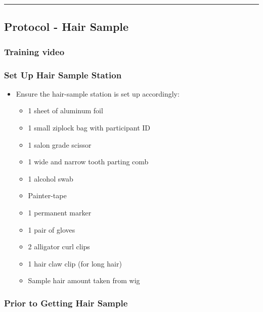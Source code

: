 \documentclass[]{book}
\providecommand{\tightlist}{%
  \setlength{\itemsep}{0pt}\setlength{\parskip}{0pt}}
\begin{document}
\begin{center}\rule{0.5\linewidth}{0.5pt}\end{center}

\hypertarget{protocol---hair-sample}{%
\subsection{Protocol - Hair Sample}\label{protocol---hair-sample}}

\hypertarget{training-video}{%
\subsubsection{Training video}\label{training-video}}

\hypertarget{set-up-hair-sample-station}{%
\subsubsection{Set Up Hair Sample Station}\label{set-up-hair-sample-station}}

\begin{itemize}
\tightlist
\item
  Ensure the hair-sample station is set up accordingly:

  \begin{itemize}
  \tightlist
  \item
    1 sheet of aluminum foil
  \item
    1 small ziplock bag with participant ID
  \item
    1 salon grade scissor
  \item
    1 wide and narrow tooth parting comb
  \item
    1 alcohol swab
  \item
    Painter-tape
  \item
    1 permanent marker
  \item
    1 pair of gloves
  \item
    2 alligator curl clips
  \item
    1 hair claw clip (for long hair)
  \item
    Sample hair amount taken from wig
  \end{itemize}
\end{itemize}

\hypertarget{prior-to-getting-hair-sample}{%
\subsubsection{Prior to Getting Hair Sample}\label{prior-to-getting-hair-sample}}
\end{document}
